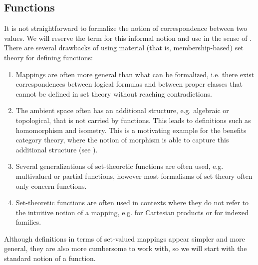 \subsection{Functions}\label{subsec:functions}

\begin{remark}\label{remark:function_definition}
  It is not straightforward to formalize the notion of correspondence between two values. We will reserve the term  for this informal notion and use  in the sense of . There are several drawbacks of using material (that is, membership-based) set theory for defining functions:
  \begin{enumerate}
    \item Mappings are often more general than what can be formalized, i.e. there exist correspondences between logical formulas and between proper classes that cannot be defined in set theory without reaching contradictions.
    \item The ambient space often has an additional structure, e.g. algebraic or topological, that is not carried by functions. This leads to definitions such as homomorphism and isometry. This is a motivating example for the benefits category theory, where the notion of morphism is able to capture this additional structure (see ).
    \item Several generalizations of set-theoretic functions are often used, e.g. multivalued or partial functions, however most formalisms of set theory often only concern functions.
    \item Set-theoretic functions are often used in contexts where they do not refer to the intuitive notion of a mapping, e.g. for Cartesian products or for indexed families.
  \end{enumerate}

  Although definitions in terms of set-valued mappings appear simpler and more general, they are also more cumbersome to work with, so we will start with the standard notion of a function.
\end{remark}

